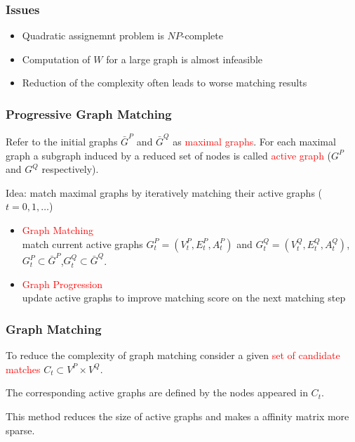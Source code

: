 \documentclass[hyperref={pdfpagelabels=false}]{beamer}
\begin{document}
\begin{frame}
\frametitle{Issues}
\begin{itemize}
\item Quadratic assignemnt problem is $NP$-complete
\item Computation of $W$ for a large graph is almost infeasible
\item Reduction of the complexity often leads to worse matching results
\end{itemize}
\end{frame}

\begin{frame}
\frametitle{Progressive Graph Matching}
Refer to the initial graphs $\bar{G}^P$ and $\bar{G}^Q$ as \textcolor{red}{maximal graphs}. 
For each maximal graph a subgraph induced by a reduced set of nodes is called \textcolor{red}{active graph} ($G^P$ and $G^Q$ respectively).

\vspace{10pt}
Idea: match maximal graphs by iteratively matching their active graphs ($t=0,1,\dots$)
\begin{itemize}
\item \textcolor{red}{Graph Matching}\\
		match current active graphs $G_t^P=(V_t^P, E_t^P, A_t^P)$ and $G_t^Q=(V_t^Q, E_t^Q, A_t^Q)$, $G_t^P\subset \bar{G}^P$,$G_t^Q\subset \bar{G}^Q$.
\item \textcolor{red}{Graph Progression}\\
		update active graphs to improve matching score on the next matching step
\end{itemize}

\end{frame}

\begin{frame}
\frametitle{Graph Matching}
To reduce the complexity of graph matching consider a given \textcolor{red}{set of candidate matches} $C_t\subset V^P\times V^Q$.

The corresponding active graphs are defined by the nodes appeared in $C_t$.

This method reduces the size of active graphs and makes a affinity matrix more sparse.

\end{frame}
\end{document}
